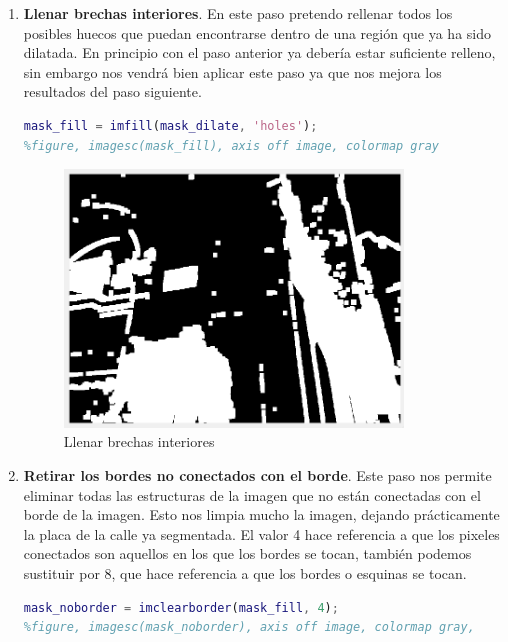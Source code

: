 \documentclass[12pt]{article}
\begin{document}
\begin{enumerate}
		\pagebreak
		
		\item \textbf{Llenar brechas interiores}. En este paso pretendo rellenar todos los posibles huecos que puedan encontrarse dentro de una región que ya ha sido dilatada. En principio con el paso anterior ya debería estar suficiente relleno, sin embargo nos vendrá bien aplicar este paso ya que nos mejora los resultados del paso siguiente.
		\begin{lstlisting}[language=matlab, caption={Llenar brechas interiores}]
% Llenar brechas interiores
mask_fill = imfill(mask_dilate, 'holes');
%figure, imagesc(mask_fill), axis off image, colormap gray
		\end{lstlisting}
	
		\begin{figure}[h!]
			\begin{center}
				\includegraphics[width=0.85\textwidth]{img/impl_4.png}
				\caption{Llenar brechas interiores}
				\label{img: brechas interiores}
			\end{center}
		\end{figure}
	
		\pagebreak
		
		\item \textbf{Retirar los bordes no conectados con el borde}. Este paso nos permite eliminar todas las estructuras de la imagen que no están conectadas con el borde de la imagen. Esto nos limpia mucho la imagen, dejando prácticamente la placa de la calle ya segmentada. El valor 4 hace referencia a que los pixeles conectados son aquellos en los que los bordes se tocan, también podemos sustituir por 8, que hace referencia a que los bordes o esquinas se tocan.
		\begin{lstlisting}[language=matlab, caption={Retirar los objetos no conectados con el borde}]
% Retirar los objetos no conectados con el borde
mask_noborder = imclearborder(mask_fill, 4);
%figure, imagesc(mask_noborder), axis off image, colormap gray,
		\end{lstlisting}
	

\end{enumerate}
\end{document}
